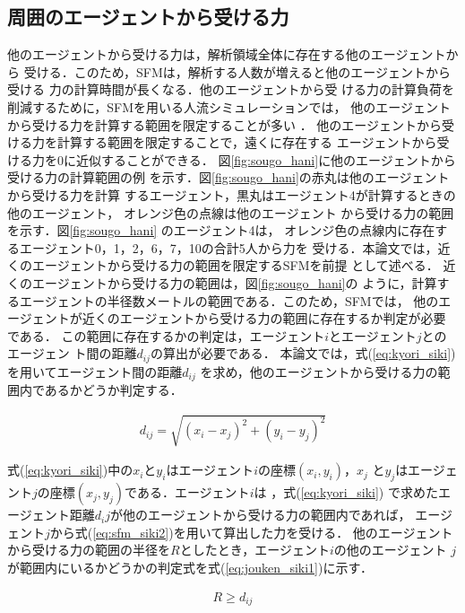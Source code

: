 \subsection{周囲のエージェントから受ける力}
他のエージェントから受ける力は，解析領域全体に存在する他のエージェントから
受ける．このため，SFMは，解析する人数が増えると他のエージェントから受ける
力の計算時間が長くなる．他のエージェントから受
ける力の計算負荷を削減するために，SFMを用いる人流シミュレーションでは，
他のエージェントから受ける力を計算する範囲を限定することが多い
\cite{seru_sfm1}\cite{seru_sfm2}．
他のエージェントから受ける力を計算する範囲を限定することで，遠くに存在する
エージェントから受ける力を0に近似することができる．
図\ref{fig:sougo_hani}に他のエージェントから受ける力の計算範囲の例
を示す．図\ref{fig:sougo_hani}の赤丸は他のエージェントから受ける力を計算
するエージェント，黒丸はエージェント4が計算するときの他のエージェント，
オレンジ色の点線は他のエージェント
から受ける力の範囲を示す．図\ref{fig:sougo_hani} のエージェント4は，
オレンジ色の点線内に存在するエージェント0，1，2，6，7，10の合計5人から力を
受ける．本論文では，近くのエージェントから受ける力の範囲を限定するSFMを前提
として述べる．
近くのエージェントから受ける力の範囲は，図\ref{fig:sougo_hani}の
ように，計算するエージェントの半径数メートルの範囲である．このため，SFMでは，
他のエージェントが近くのエージェントから受ける力の範囲に存在するか判定が必要
である．
この範囲に存在するかの判定は，エージェント$i$とエージェント$j$とのエージェン
ト間の距離$d_{ij}$の算出が必要である．
本論文では，式(\ref{eq:kyori_siki})を用いてエージェント間の距離$d_{ij}$
を求め，他のエージェントから受ける力の範囲内であるかどうか判定する．

\begin{eqnarray}
　d_{ij} =  \sqrt{ (x_i-x_j)^2 + (y_i-y_j)^2 }
 \label{eq:kyori_siki}
\end{eqnarray}


式(\ref{eq:kyori_siki})中の$x_i$と$y_i$はエージェント$i$の座標$(x_i,y_i)$，$x_j$
と$y_j$はエージェント$j$の座標$(x_j,y_j)$である．エージェント$i$は
，式(\ref{eq:kyori_siki})
で求めたエージェント距離$d_ij$が他のエージェントから受ける力の範囲内であれば，
エージェント$j$から式(\ref{eq:sfm_siki2})を用いて算出した力を受ける．
他のエージェントから受ける力の範囲の半径を$R$としたとき，エージェント$i$の他のエージェント
$j$が範囲内にいるかどうかの判定式を式(\ref{eq:jouken_siki1})に示す．

\begin{eqnarray}
  \label{eq:jouken_siki1}
  R \geq d_{ij}
\end{eqnarray}

